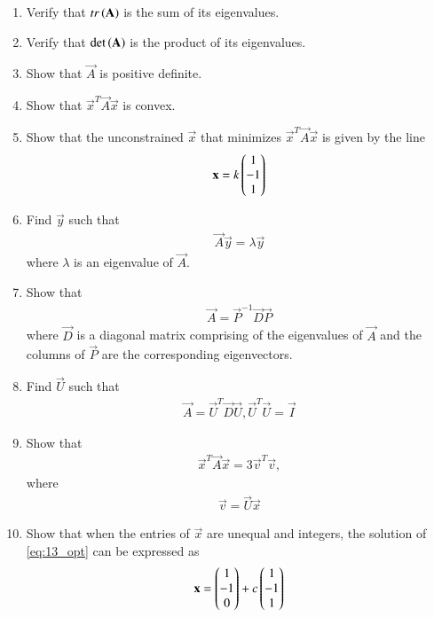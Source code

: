 \begin{enumerate}[label=\arabic*.,ref=\thesubsection.\theenumi]
\item Verify that $tr\left(\mathbf{A}\right)$ is the sum of its eigenvalues.
\item Verify that $\det\left(\mathbf{A}\right)$ is the product of  its eigenvalues.
\item Show that $\vec{A}$ is positive definite.
\item Show that $\vec{x}^{T}\vec{A}\vec{x}$ is convex.
\item Show that the unconstrained $\vec{x}$ that minimizes $\vec{x}^{T}\vec{A}\vec{x}$ is given by the line
\begin{align}
\mathbf{x} = k \begin{pmatrix}1 \\ -1 \\ 1\end{pmatrix}
\end{align}
\item Find $\vec{y}$ such that 
\begin{align}
\vec{A}\vec{y} = \lambda\vec{y}
\end{align}
where $\lambda$ is an eigenvalue of $\vec{A}$.
\item Show that 
\begin{align}
\vec{A} = \vec{P}^{-1} \vec{D}\vec{P}
\end{align}
%
where $\vec{D}$  is a diagonal matrix comprising of the eigenvalues of $\vec{A}$
and the columns of $\vec{P}$ are the corresponding eigenvectors.
\item Find $\vec{U}$ such that 
\begin{align}
\vec{A} = \vec{U}^{T} \vec{D}\vec{U}, \vec{U}^{T} \vec{U} = \vec{I}
\end{align}
\item Show that 
\begin{align}
\vec{x}^T \vec{A}\vec{x}  = 3 \vec{v}^{T} \vec{v},
\end{align}
where
\begin{align}
\vec{v} = \vec{U}\vec{x}
\end{align}
%
\item Show that when the entries of $\vec{x}$ are unequal and integers, the solution of \eqref{eq:13_opt} can be expressed as
\begin{align}
\mathbf{x} = \begin{pmatrix}1 \\ -1 \\ 0\end{pmatrix} + c\begin{pmatrix}1 \\ -1 \\ 1\end{pmatrix}
\end{align}

\end{enumerate}
